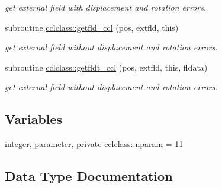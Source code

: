 \begin{DoxyCompactItemize}
\begin{DoxyCompactList}\small\item\em get external field with displacement and rotation errors. \end{DoxyCompactList}\item 
subroutine \mbox{\hyperlink{namespacecclclass_a6c8d8825e6d50c30ba91c90892619a5b}{cclclass\+::getfld\+\_\+ccl}} (pos, extfld, this)
\begin{DoxyCompactList}\small\item\em get external field without displacement and rotation errors. \end{DoxyCompactList}\item 
subroutine \mbox{\hyperlink{namespacecclclass_a4b07c783aa0e272c4924db67320c70d3}{cclclass\+::getfldt\+\_\+ccl}} (pos, extfld, this, fldata)
\begin{DoxyCompactList}\small\item\em get external field without displacement and rotation errors. \end{DoxyCompactList}\end{DoxyCompactItemize}
\subsection*{Variables}
\begin{DoxyCompactItemize}
\item 
integer, parameter, private \mbox{\hyperlink{namespacecclclass_adeb399ff41e54cda7bdefa51063c0de6}{cclclass\+::nparam}} = 11
\end{DoxyCompactItemize}


\subsection{Data Type Documentation}
\label{structcclclass_1_1ccl}
